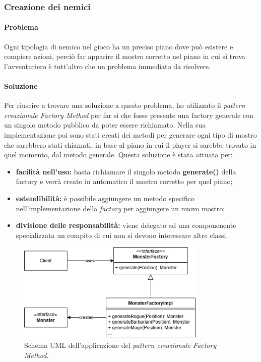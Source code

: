 \documentclass{report}
\begin{document}
\subsubsection{Creazione dei nemici}

\paragraph{Problema} Ogni tipologia di nemico nel gioco ha un preciso piano dove può esistere e compiere azioni, perciò far apparire il mostro corretto nel piano in cui si trova l'avventuriero è
%
tutt'altro che un problema immediato da risolvere.

\paragraph{Soluzione} Per riuscire a trovare una soluzione a questo problema, ho utilizzato il \textit{pattern creazionale Factory Method} per far sì che fosse presente una factory generale
%
con un singolo metodo pubblico da poter essere richiamato. Nella sua implementazione poi sono stati creati dei metodi per generare ogni tipo di mostro che sarebbero stati chiamati, in base
%
al piano in cui il player si sarebbe trovato in quel momento, dal metodo generale. Questa soluzione è stata attuata per:

\begin{itemize}
    \item \textbf{facilità nell'uso:} basta richiamare il singolo metodo \textbf{generate()} della factory e verrà creato in automatico il mostro corretto per quel piano;
    \item \textbf{estendibilità:} è possibile aggiungere un metodo specifico nell'implementazione della \textit{factory} per aggiungere un nuovo mostro;
    \item \textbf{divisione delle responsabilità:} viene delegato ad una componenente specializzata un compito di cui non si devono interessare altre classi.
\end{itemize}

\begin{figure}[H]
    \centering
    \includegraphics[width=9cm]{FactoryMethod.png}
    \caption{Schema UML dell'applicazione del \textit{pattern creazionale Factory Method}.}
\end{figure}
\end{document}
